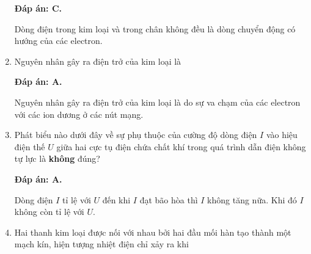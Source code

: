 \begin{enumerate}[label=\bfseries Câu \arabic*:]
{}
\loigiai
{	\textbf{Đáp án: C.}
	
	Dòng điện trong kim loại và trong chân không đều là dòng chuyển động có hướng của các electron.
}
	\item {}

\cauhoi
{Nguyên nhân gây ra điện trở của kim loại là
	
}
\loigiai
{	\textbf{Đáp án: A.}
	
	Nguyên nhân gây ra điện trở của kim loại là do sự va chạm của các electron với các ion dương ở các nút mạng.
}
	\item {}

\cauhoi
{Phát biểu nào dưới đây về sự phụ thuộc của cường độ dòng điện $I$ vào hiệu điện thế $U$ giữa hai cực tụ điện chứa chất khí trong quá trình dẫn điện không tự lực là \textbf{không} đúng?
	
}
\loigiai
{	\textbf{Đáp án: A.}
	
	Dòng điện $I$ tỉ lệ với $U$ đến khi $I$ đạt bão hòa thì $I$ không tăng nữa. Khi đó $I$ không còn tỉ lệ với $U$.
}
	\item {}

\cauhoi
{Hai thanh kim loại được nối với nhau bởi hai đầu mối hàn tạo thành một mạch kín, hiện tượng nhiệt điện chỉ xảy ra khi
	
}
\end{enumerate}
